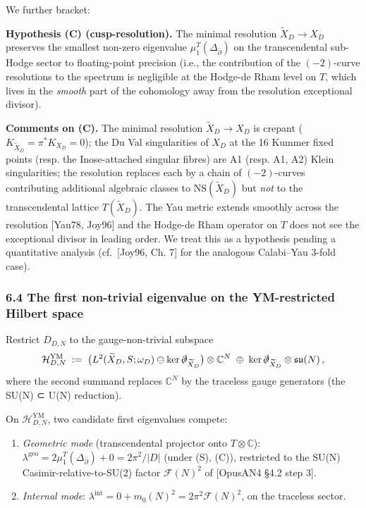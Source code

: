 \documentclass[
  11pt,
  a4paper,
]{amsart}
\begin{document}
We further bracket:

\textbf{Hypothesis (C) (cusp-resolution).} The minimal resolution \(\widetilde{X}_D \to X_D\)
preserves the smallest non-zero eigenvalue \(\mu_1^T(\Delta_{\bar\partial})\) on
the transcendental sub-Hodge sector to floating-point precision (i.e., the
contribution of the \((-2)\)-curve resolutions to the spectrum is negligible at
the Hodge-de Rham level on \(T\), which lives in the \emph{smooth} part of the
cohomology away from the resolution exceptional divisor).

\textbf{Comments on (C).} The minimal resolution \(\widetilde{X}_D \to X_D\) is
crepant (\(K_{\widetilde{X}_D} = \pi^* K_{X_D} = 0\)); the Du Val singularities of
\(X_D\) at the 16 Kummer fixed points (resp. the Inose-attached singular fibres)
are A1 (resp. A1, A2) Klein singularities; the resolution replaces each by a
chain of \((-2)\)-curves contributing additional algebraic classes to
\(\mathrm{NS}(\widetilde{X}_D)\) but \emph{not} to the transcendental lattice
\(T(\widetilde{X}_D)\). The Yau metric extends smoothly across the resolution
{[}Yau78, Joy96{]} and the Hodge-de Rham operator on \(T\) does not see the
exceptional divisor in leading order. We treat this as a hypothesis pending a
quantitative analysis (cf.~{[}Joy96, Ch. 7{]} for the analogous Calabi--Yau
3-fold case).

\hypertarget{the-first-non-trivial-eigenvalue-on-the-ym-restricted-hilbert-space}{%
\subsubsection{6.4 The first non-trivial eigenvalue on the YM-restricted Hilbert space}\label{the-first-non-trivial-eigenvalue-on-the-ym-restricted-hilbert-space}}

Restrict \(D_{D,N}\) to the gauge-non-trivial subspace
\begin{equation}\label{eq:Hym}
\mathcal{H}_{D,N}^{\mathrm{YM}} \;:=\; \bigl(L^2(\widetilde{X}_D, S; \omega_D) \ominus \ker \slashed{\partial}_{\widetilde{X}_D}\bigr) \otimes \mathbb{C}^N \;\oplus\; \ker \slashed{\partial}_{\widetilde{X}_D} \otimes \mathfrak{su}(N)\,,
\end{equation}
where the second summand replaces \(\mathbb{C}^N\) by the traceless gauge
generators (the SU(N) ⊂ U(N) reduction).

On \(\mathcal{H}_{D,N}^{\mathrm{YM}}\), two candidate first eigenvalues compete:

\begin{enumerate}
\def\labelenumi{(\roman{enumi})}
\item
  \emph{Geometric mode} (transcendental projector onto \(T \otimes \mathbb{C}\)):
  \(\lambda^{\mathrm{geo}} = 2\mu_1^T(\Delta_{\bar\partial}) + 0 = 2\pi^2/|D|\)
  (under (S), (C)), restricted to the SU(N) Casimir-relative-to-SU(2) factor
  \(\mathcal{F}(N)^2\) of {[}OpusAN4 §4.2 step 3{]}.
\item
  \emph{Internal mode}: \(\lambda^{\mathrm{int}} = 0 + m_0(N)^2 = 2\pi^2 \mathcal{F}(N)^2\),
  on the traceless sector.
\end{enumerate}
\end{document}
